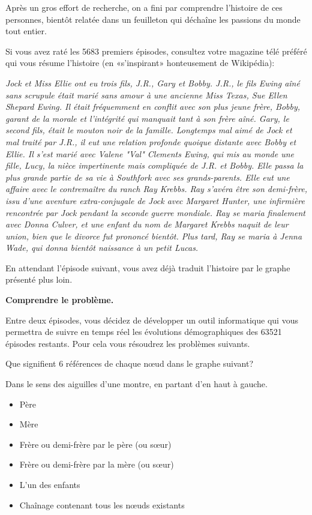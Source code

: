 \documentclass[10pt]{article}\usepackage[nu]{esial}
\begin{document}
Après un gros effort de recherche, on a fini par comprendre l'histoire de ces
personnes, bientôt relatée dans un feuilleton qui déchaîne les passions du
monde tout entier.

Si vous avez raté les 5683 premiers épisodes, consultez votre magazine télé
préféré qui vous résume l'histoire (en «s'inspirant» honteusement de Wikipédia):

\emph{Jock et Miss Ellie ont eu trois fils, J.R., Gary et Bobby. J.R., le fils
  Ewing aîné sans scrupule était marié sans amour à une ancienne Miss Texas,
  Sue Ellen Shepard Ewing. Il était fréquemment en conflit avec son plus jeune
  frère, Bobby, garant de la morale et l'intégrité qui manquait tant à son
  frère aîné. Gary, le second fils, était le mouton noir de la
  famille. Longtemps mal aimé de Jock et mal traité par J.R., il eut une
  relation profonde quoique distante avec Bobby et Ellie. Il s'est marié avec
  Valene "Val" Clements Ewing, qui mis au monde une fille, Lucy, la nièce
  impertinente mais compliquée de J.R. et Bobby. Elle passa la plus grande
  partie de sa vie à Southfork avec ses grands-parents. Elle eut une affaire
  avec le contremaître du ranch Ray Krebbs. Ray s'avéra être son demi-frère,
  issu d'une aventure extra-conjugale de Jock avec Margaret Hunter, une
  infirmière rencontrée par Jock pendant la seconde guerre mondiale.  Ray se
  maria finalement avec Donna Culver, et une enfant du nom de Margaret Krebbs
  naquit de leur union, bien que le divorce fut prononcé bientôt. Plus tard,
  Ray se maria à Jenna Wade, qui donna bientôt naissance à un petit Lucas.}

En attendant l'épisode suivant, vous avez déjà traduit l'histoire par
le graphe présenté plus loin.

\Exercice\textbf{Comprendre le problème.}

Entre deux épisodes, vous décidez de développer un outil informatique qui vous
permettra de suivre en temps réel les évolutions démographiques des 63521
épisodes restants. Pour cela vous résoudrez les problèmes suivants.

\Question Que signifient 6 références de chaque nœud dans le graphe suivant?

\begin{Reponse}
  Dans le sens des aiguilles d'une montre, en partant d'en haut à gauche.
  \begin{itemize}
  \item Père
  \item Mère
  \item Frère ou demi-frère par le père (ou sœur)
  \item Frère ou demi-frère par la mère (ou sœur)
  \item L'un des enfants
  \item Chaînage contenant tous les nœuds existants
  \end{itemize}

\end{Reponse}
\end{document}
